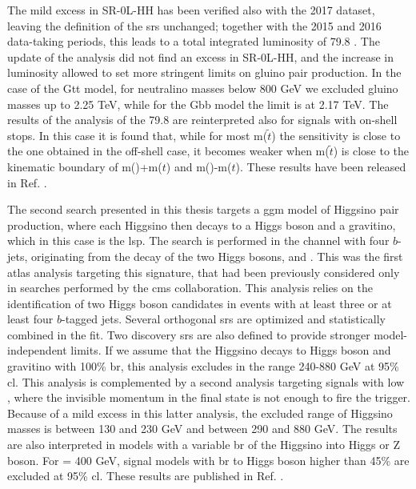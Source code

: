 The mild excess in SR-0L-HH has been verified also with the 2017 dataset,
leaving the definition of the \glspl{sr} unchanged; 
together with the 2015 and 2016 data-taking periods, this leads to a total integrated luminosity 
of 79.8 \ifb. 
The update of the analysis did not find an excess in SR-0L-HH, and the increase in luminosity 
allowed to set more stringent limits on gluino pair production. 
In the case of the Gtt model, for neutralino masses below 800 GeV we excluded gluino masses up to 
2.25 TeV, while for the Gbb model the limit is at 2.17 TeV. 
The results of the analysis of the 79.8 \ifb are reinterpreted also for signals with on-shell 
stops. In this case it is found that, while for most m($\tilde{t}$) the sensitivity 
is close to the one obtained in the off-shell case, it becomes weaker 
when m($\tilde{t}$) is close to the kinematic boundary of 
m(\ninoone)+m($t$) and m(\gluino)-m($t$).  
These results have been released in Ref. \cite{ATLAS-CONF-2018-041}.


The second search presented in this thesis targets a \gls{ggm} model of Higgsino pair production, 
where each Higgsino then decays to a Higgs boson and 
a gravitino, which in this case is the \gls{lsp}. The search is performed in the channel with four $b$-jets, originating from 
the decay of the two Higgs bosons, and \met. 
This was the first \gls{atlas} analysis targeting this signature, that had been 
previously considered only in searches performed by the \gls{cms} collaboration.
This analysis relies on the identification of two Higgs boson candidates in events with at least three or 
at least four $b$-tagged jets. Several orthogonal \glspl{sr} are optimized and statistically combined in the fit. 
Two discovery \glspl{sr} are also defined to provide stronger model-independent limits. 
If we assume that the Higgsino decays to Higgs boson and gravitino with 100\% \gls{br}, 
this analysis excludes \mhino in the range 240-880 GeV at 95\% \gls{cl}. 
This analysis is complemented by a second analysis targeting signals with low \mhino, where the 
invisible momentum in the final state is not enough to fire the \met trigger. 
Because of a mild excess in this latter analysis, the excluded range of Higgsino masses is 
between 130 and 230 GeV and between 290 and 880 GeV.
The results are also interpreted in models with a variable \gls{br} of the Higgsino into Higgs or Z boson. 
For \mhino = 400 GeV, signal models with \gls{br} to Higgs boson higher than 45\% are 
excluded at 95\% \gls{cl}.
These results are published in Ref. \cite{Aaboud:2018htj}. 

